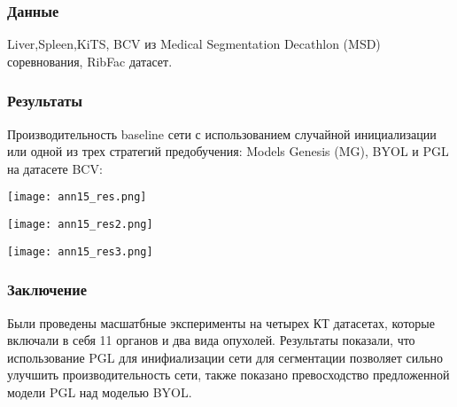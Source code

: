 \subsubsection*{Данные}
Liver,Spleen,KiTS, BCV из Medical Segmentation
Decathlon (MSD) соревнования, RibFac датасет.
\subsubsection*{Результаты}
Производительность baseline сети с использованием случайной инициализации или одной из трех 
стратегий предобучения: Models Genesis (MG), BYOL и  PGL на датасете BCV:

\begin{minipage}{1.0\linewidth}
    \begin{center}
        \texttt{[image: ann15\_res.png]} \\
    \end{center}
\end{minipage}


\begin{minipage}{0.49\linewidth}
    \begin{center}
        \texttt{[image: ann15\_res2.png]} \\
    \end{center}
    
\end{minipage}
\begin{minipage}{0.49\linewidth}
    \begin{center}
        \texttt{[image: ann15\_res3.png]} \\
    \end{center}
    
\end{minipage} 


\subsubsection*{Заключение}
Были проведены масшатбные эксперименты на четырех КТ датасетах, которые включали в себя 
11 органов и два вида опухолей. Результаты показали, что использование PGL для инифиализации 
сети для сегментации позволяет сильно улучшить производительность сети, также показано 
превосходство предложенной модели PGL над моделью BYOL.